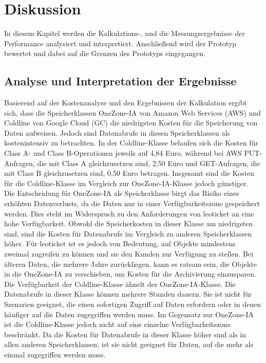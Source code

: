 \chapter{Diskussion}

In diesem Kapitel werden die Kalkulations-, und die Messungsergebnisse der Performance analysiert und interpretiert. Anschließend wird der Prototyp bewertet und dabei auf die Grenzen des Prototyps eingegangen.
  
\section{Analyse und Interpretation der Ergebnisse}

Basierend auf der Kostenanalyse und den Ergebnissen der Kalkulation ergibt sich, dass die Speicherklassen OneZone-IA von Amazon Web Services (AWS) und Coldline von Google Cloud (GC) die niedrigsten Kosten für die Speicherung von Daten aufweisen. Jedoch sind Datenabrufe in diesen Speicherklassen als kostenintensiv zu betrachten. In der Coldline-Klasse belaufen sich die Kosten für Class A- und Class B-Operationen jeweils auf 4,84 Euro, während bei AWS PUT-Anfragen, die mit Class A gleichzusetzen sind, 2,50 Euro und GET-Anfragen, die mit Class B gleichzusetzen sind, 0,50 Euro betragen. Insgesamt sind die Kosten für die Coldline-Klasse im Vergleich zur OneZone-IA-Klasse jedoch günstiger.\\ 

Die Entscheidung für OneZone-IA als Speicherklasse birgt das Risiko eines erhöhten Datenverlusts, da die Daten nur in einer Verfügbarkeitszone gespeichert werden. Dies steht im Widerspruch zu den Anforderungen von leoticket an eine hohe Verfügbarkeit. Obwohl die Speicherkosten in dieser Klasse am niedrigsten sind, sind die Kosten für Datenabrufe im Vergleich zu anderen Speicherklassen höher. Für leoticket ist es jedoch von Bedeutung, auf Objekte mindestens zweimal zugreifen zu können und sie den Kunden zur Verfügung zu stellen. Bei älteren Daten, die mehrere Jahre zurückliegen, kann es ratsam sein, die Objekte in die OneZone-IA zu verschieben, um Kosten für die Archivierung einzusparen.\\

Die Verfügbarkeit der Coldline-Klasse ähnelt der OneZone-IA-Klasse. Die Datenabrufe in dieser Klasse können mehrere Stunden dauern. Sie ist nicht für Szenarien geeignet, die einen sofortigen Zugriff auf Daten erfordern oder in denen häufiger auf die Daten zugegriffen werden muss. Im Gegensatz zur OneZone-IA ist die Coldline-Klasse jedoch nicht auf eine einzelne Verfügbarkeitszone beschränkt. Da die Kosten für Datenabrufe in dieser Klasse höher sind als in allen anderen Speicherklassen, ist sie nicht geeignet für Daten, auf die mehr als einmal zugegriffen werden muss.\\

